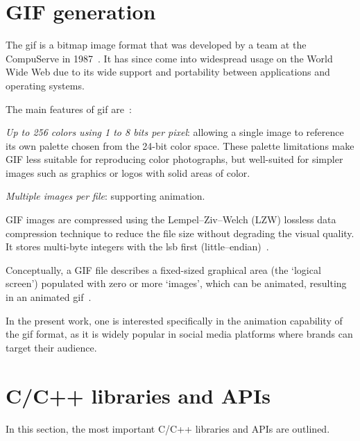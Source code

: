 %
\section{GIF generation}
\label{sec:gif-generation}
The \acrfull{gif} is a bitmap image format that was developed by a team at the
CompuServe in 1987~\cite{gifSpec87}. It has since come into widespread usage on the World Wide Web due to its wide support and portability between applications and operating systems.

The main features of \gls{gif} are~\cite{miano1999compressed}:
\begin{enum-c}
\item \emph{Up to 256 colors using 1 to 8 bits per pixel}: allowing a single image to
  reference its own palette chosen from the 24-bit color space. These palette
  limitations make GIF less suitable for reproducing color photographs, but
  well-suited for simpler images such as graphics or logos with solid areas of
  color.
\item \emph{Multiple images per file}: supporting animation.
\end{enum-c}

GIF images are compressed using the Lempel–Ziv–Welch (LZW) lossless data
compression technique to reduce the file size without degrading the visual
quality. It stores multi-byte integers with the \gls{lsb} first
(little--endian)~\cite{miano1999compressed}.

Conceptually, a GIF file describes a fixed-sized graphical area (the `logical
screen') populated with zero or more `images', which can be animated, resulting
in an animated \gls{gif}~\cite{gifSpec87}.

In the present work, one is interested specifically in the animation capability
of the \gls{gif} format, as it is widely popular in social media platforms where
brands can target their audience.

\section{C/C++ libraries and APIs}
\label{sec:c++-libraries-apis-1}
In this section, the most important C/C++ libraries and APIs are outlined.

